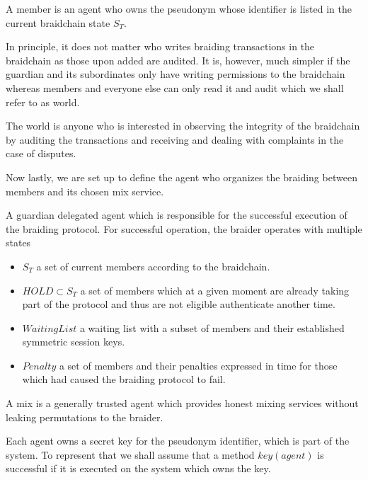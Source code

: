 \documentclass[12pt]{article}
\newenvironment{definition}[2][Definition]{\begin{trivlist}
\item[\hskip \labelsep {\bfseries #1}\hskip \labelsep {\bfseries #2.}]}{\end{trivlist}}
\begin{document}
\begin{definition}{(member)}
  A member is an agent who owns the pseudonym whose identifier is listed in the current braidchain state $S_T$. 
\end{definition}

In principle, it does not matter who writes braiding transactions in the braidchain as those upon added are audited. It is, however, much simpler if the guardian and its subordinates only have writing permissions to the braidchain whereas members and everyone else can only read it and audit which we shall refer to as world.

\begin{definition}{(world)}
  The world is anyone who is interested in observing the integrity of the braidchain by auditing the transactions and receiving and dealing with complaints in the case of disputes.
\end{definition}

Now lastly, we are set up to define the agent who organizes the braiding between members and its chosen mix service.

\begin{definition}{(braider)}
  A guardian delegated agent which is responsible for the successful execution of the braiding protocol. For successful operation, the braider operates with multiple states
  \begin{itemize}
  \item $S_T$ a set of current members according to the braidchain.
  \item $HOLD \subset S_T$ a set of members which at a given moment are already taking part of the protocol and thus are not eligible authenticate another time.
  \item $WaitingList$ a waiting list with a subset of members and their established symmetric session keys. 
  \item $Penalty$ a set of members and their penalties expressed in time for those which had caused the braiding protocol to fail.
  \end{itemize}
\end{definition}

\begin{definition}{(mix)}
  A mix is a generally trusted agent which provides honest mixing services without leaking permutations to the braider. 
\end{definition}

Each agent owns a secret key for the pseudonym identifier, which is part of the system. To represent that we shall assume that a method $key(agent)$ is successful if it is executed on the system which owns the key. 
\end{document}
